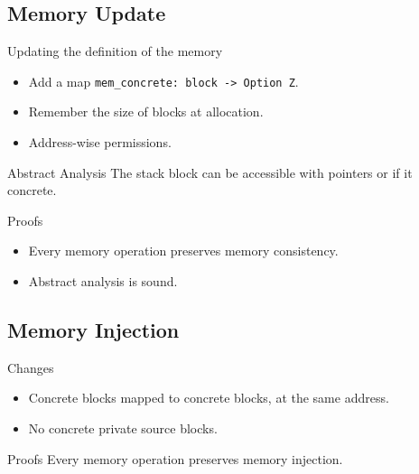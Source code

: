 \subsection{Memory Update}
\begin{frame}{\subsecname}

  \begin{block}{Updating the definition of the memory}
    \begin{itemize}
    \item Add a map \texttt{mem\_concrete: block -> Option Z}.
    \item Remember the size of blocks at allocation.
    \item Address-wise permissions.
    \end{itemize}
  \end{block}
  \vfill
  \begin{block}{Abstract Analysis}
    The stack block can be accessible with pointers or if it concrete.
  \end{block}
    \vfill
    \begin{exampleblock}{Proofs}
      \begin{itemize}
      \item Every memory operation preserves memory consistency.
      \item Abstract analysis is sound.
      \end{itemize}
  \end{exampleblock}

  
\end{frame}

\subsection{Memory Injection}
\begin{frame}{\subsecname}

  \vfill
  \begin{block}{Changes}
    \begin{itemize}
    \item Concrete blocks mapped to concrete blocks, at the same address.
    \item No concrete private source blocks.
    \end{itemize}
  \end{block}
  \vfill
  \begin{exampleblock}{Proofs}
    Every memory operation preserves memory injection.
  \end{exampleblock}
  
\end{frame}

